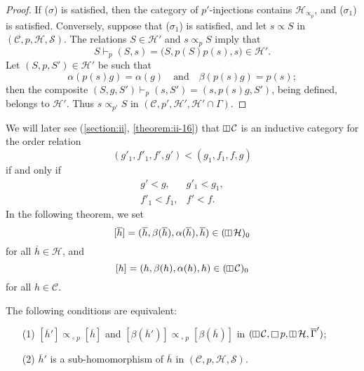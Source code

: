 \documentclass[a4paper,fleqn]{article}
\theoremstyle{plain}
\newenvironment{theorem}[1]
  {\renewcommand\theinnertheorem{#1}\innertheorem}
  {\endinnertheorem}
\theoremstyle{definition}
\newcommand{\oldpage}[1]{{\marginpar{\footnotesize$\bigg\vert$\,\,\,\,\textit{p.~#1}}}}
\newcommand{\textand}{\quad\text{and}\quad}
\newcommand{\CC}{\mathcal{C}}
\newcommand{\HH}{\mathcal{H}}
\renewcommand{\SS}{\mathcal{S}}
\newcommand{\subs}{\mathrel{\propto}}
\newcommand{\vsqbox}{{\rotatebox{90}{$\boxminus$}}}
\DeclareMathOperator{\sq}{\square}
\DeclareMathOperator{\vsq}{\raisebox{-.1em}{$\vsqbox$}}
\begin{document}
\begin{proof}
  If ($\sigma$) is satisfied, then the category of $p'$-injections contains $\HH_{\subs_p}$, and ($\sigma_1$) is satisfied.
  Conversely, suppose that ($\sigma_1$) is satisfied, and let $s\subs S$ in $(\CC,p,\HH,\SS)$.
  The relations $S\in\HH'$ and $s\subs_p S$ imply that
  \[
    S\vdash_p(S,s)
    = \big(
      S,p(S)p(s),s
    \big) \in \HH'.
  \]
  Let $(S,p,S')\in\HH'$ be such that
  \[
    \alpha(p(s)g) = \alpha(g)
    \textand
    \beta(p(s)g) = p(s);
  \]
  then the composite $(S,g,S')\vdash_p(s,S')=(s,p(s)g,S')$, being defined, belongs to $\HH'$.
  Thus $s\subs_{p'}S$ in $(\CC,p',\HH',\HH'\cap\Gamma)$.
\end{proof}

We will later see (\cref{section:ii}, \cref{theorem:ii-16}) that $\vsq\CC$ is an inductive category for the order relation
\[
  (g'_1,f'_1,f',g')
  < (g_1,f_1,f,g)
\]
\oldpage{368}
if and only if
\[
  \begin{array}{ll}
    g'<g,
    & g'_1<g_1,
  \\f'_1<f_1,
    & f'<f.
  \end{array}
\]
In the following theorem, we set
\[
  [\overline{h}]
  = (\overline{h},\beta(\overline{h}),\alpha(\overline{h}),\overline{h})
  \in (\vsq\HH)_0
\]
for all $\overline{h}\in\HH$, and
\[
  [h]
  = (h,\beta(h),\alpha(h),h)
  \in (\vsq\CC)_0
\]
for all $h\in\CC$.

\begin{theorem}{2}
\label{theorem:i-2}
  The following conditions are equivalent:
  \begin{enumerate}
    \item[\normalfont(1)] $[\overline{h}']\subs_{\sq p}[\overline{h}]$ and $[\beta(\overline{h}')]\subs_{\sq p}[\beta(\overline{h})]$ in $(\vsq\CC,\sq p,\vsq\HH,\overline{\Gamma}')$;
    \item[\normalfont(2)] $\overline{h}'$ is a sub-homomorphism of $\overline{h}$ in $(\CC,p,\HH,\SS)$.
  \end{enumerate}
\end{theorem}
\end{document}
